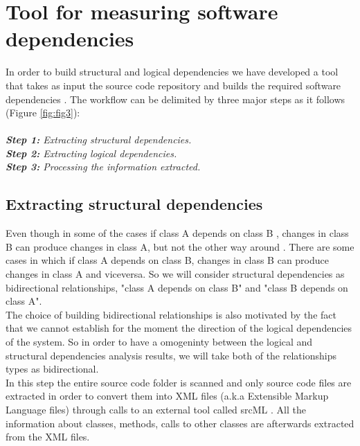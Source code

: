 \documentclass[conference,compsoc]{IEEEtran}
\begin{document}
\section{Tool for measuring software dependencies}
In order to build structural and logical dependencies we have developed a tool that takes as input the source code repository and builds the required software dependencies . The workflow can be delimited by three major steps as it follows (Figure \ref{fig:fig3}):\\ \\
\textit{\textbf{Step 1:} Extracting structural dependencies.}\\
\textit{\textbf{Step 2:} Extracting logical dependencies.}\\
\textit{\textbf{Step 3:} Processing the information extracted.}\\


\subsection{ Extracting structural dependencies}
Even though in some of the cases if class A depends on class B , changes in class B can produce changes in class A, but not the other way around \cite{ct5} . There are some cases in which if class A depends on class B,  changes in class B can produce changes in class A and viceversa. So we will consider structural dependencies as bidirectional relationships, "class A depends on class B" and "class B depends on class A". \\The choice of building bidirectional relationships is also motivated by the fact that we cannot establish for the moment the direction of the logical dependencies of the system. So in order to have a omogeninty between the logical and structural dependencies analysis results, we will take both of the relationships types as bidirectional. \\
In this step the entire source code folder is scanned and only source code files are extracted in order to convert them into XML files (a.k.a  Extensible Markup Language files) through calls to an external tool called srcML \cite{ct9}. All the information about classes, methods, calls to other classes are afterwards extracted from the XML files.
\end{document}
